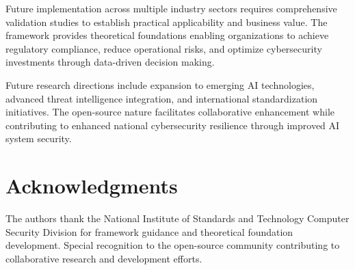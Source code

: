 \documentclass[11pt,letterpaper]{article}
\begin{document}
Future implementation across multiple industry sectors requires comprehensive validation studies to establish practical applicability and business value. The framework provides theoretical foundations enabling organizations to achieve regulatory compliance, reduce operational risks, and optimize cybersecurity investments through data-driven decision making.

Future research directions include expansion to emerging AI technologies, advanced threat intelligence integration, and international standardization initiatives. The open-source nature facilitates collaborative enhancement while contributing to enhanced national cybersecurity resilience through improved AI system security.

\section*{Acknowledgments}

The authors thank the National Institute of Standards and Technology Computer Security Division for framework guidance and theoretical foundation development. Special recognition to the open-source community contributing to collaborative research and development efforts.
\end{document}
